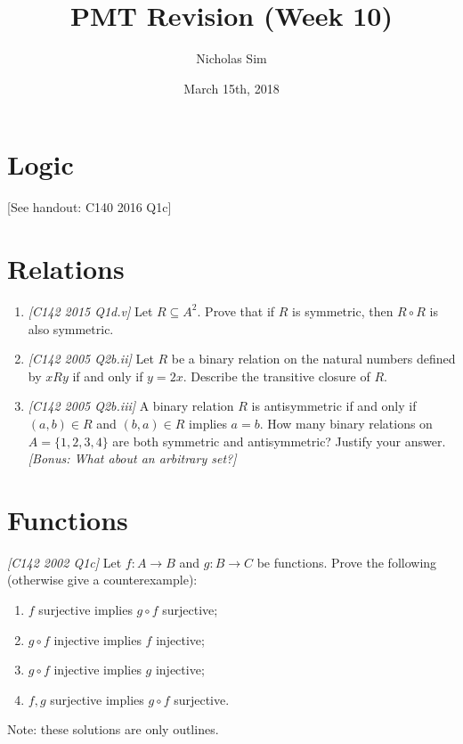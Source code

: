 \documentclass[10pt,a4paper]{article}
\begin{document}
\title{PMT Revision (Week 10)}
\author{Nicholas Sim}
\date{March 15th, 2018}
\maketitle{}


\section{Logic}
[See handout: C140 2016 Q1c]


\section{Relations}
\begin{enumerate}
	\item \emph{[C142 2015 Q1d.v]} Let \(R \subseteq A^2\).
	Prove that if \(R\) is symmetric, then \(R\circ R\) is also symmetric. 
	\item \emph{[C142 2005 Q2b.ii]} Let \(R\) be a binary relation on the natural numbers defined by \(xRy\) if and only if \(y = 2x\).
	Describe the transitive closure of \(R\).
	\item \emph{[C142 2005 Q2b.iii]} A binary relation \(R\) is antisymmetric if and only if \((a,b) \in R \) and \((b, a) \in R\) implies \(a=b\).
	How many binary relations on \(A = \{1, 2, 3, 4\}\) are both symmetric and antisymmetric? Justify your answer. \\
	\emph{[Bonus: What about an arbitrary set?]}
\end{enumerate}


\section{Functions}
\emph{[C142 2002 Q1c]} Let \(f: A\rightarrow B\) and \(g: B \rightarrow C \) be functions.
Prove the following (otherwise give a counterexample):
\begin{enumerate}
	\item \(f\) surjective implies \(g \circ f\) surjective;
	\item \(g \circ f\) injective implies \(f\) injective;
	\item \(g \circ f\) injective implies \(g\) injective;
	\item \(f, g\) surjective implies \(g \circ f\) surjective.
\end{enumerate}


\newpage

Note: these solutions are only outlines.
\end{document}
